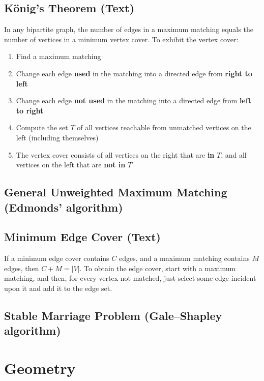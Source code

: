 \documentclass[12pt]{extarticle}
\begin{document}
\begin{multicols*}{2}
\subsection{K\"onig's Theorem (Text)} %
In any bipartite graph, the number of edges in a maximum matching equals the
number of vertices in a minimum vertex cover. To exhibit the vertex cover:
\begin{enumerate}
\item Find a maximum matching
\item Change each edge \textbf{used} in the matching into a directed edge from
\textbf{right to left}
\item Change each edge \textbf{not used} in the matching into a directed edge
from \textbf{left to right}
\item Compute the set $T$ of all vertices reachable from unmatched vertices on
the left (including themselves)
\item The vertex cover consists of all vertices on the right that are
\textbf{in} $T$, and all vertices on the left that are \textbf{not in} $T$
\end{enumerate}

\subsection{General Unweighted Maximum Matching (Edmonds' algorithm)}


\subsection{Minimum Edge Cover (Text)} %
If a minimum edge cover contains $C$ edges, and a maximum matching contains $M$
edges, then $C + M = |V|$. To obtain the edge cover, start with a maximum
matching, and then, for every vertex not matched, just select some edge
incident upon it and add it to the edge set. 

\subsection{Stable Marriage Problem (Gale--Shapley algorithm)} %


\section{Geometry}


\end{multicols*}
\end{document}
